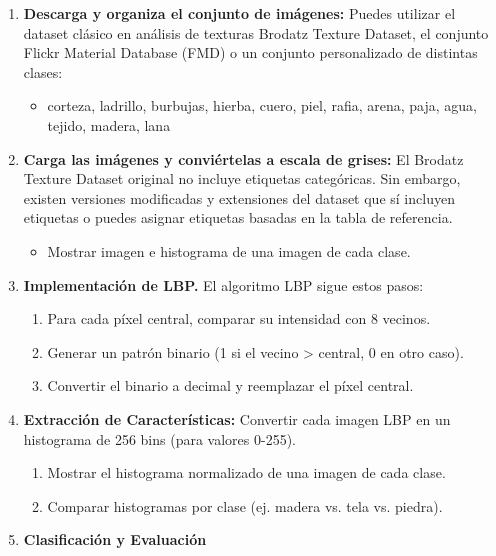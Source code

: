 
\begin{enumerate}
    \item \textbf{Descarga y organiza el conjunto de imágenes:} Puedes utilizar el dataset clásico
          en análisis de texturas Brodatz Texture Dataset, el conjunto Flickr Material Database (FMD) o
          un conjunto personalizado de distintas clases:
          \begin{itemize}
              \item corteza, ladrillo, burbujas, hierba, cuero, piel, rafia, arena, paja, agua, tejido,
                    madera, lana
          \end{itemize}
    \item \textbf{Carga las imágenes y conviértelas a escala de grises:} El Brodatz Texture
          Dataset original no incluye etiquetas categóricas. Sin embargo, existen versiones modificadas
          y extensiones del dataset que sí incluyen etiquetas o puedes asignar etiquetas basadas en la
          tabla de referencia.
          \begin{itemize}
              \item Mostrar imagen e histograma de una imagen de cada clase.
          \end{itemize}
    \item \textbf{Implementación de LBP.} El algoritmo LBP sigue estos pasos:
          \begin{enumerate}
              \item Para cada píxel central, comparar su intensidad con 8 vecinos.
              \item Generar un patrón binario (1 si el vecino > central, 0 en otro caso).
              \item Convertir el binario a decimal y reemplazar el píxel central.
          \end{enumerate}
    \item \textbf{Extracción de Características:} Convertir cada imagen LBP en un histograma de
          256 bins (para valores 0-255).
          \begin{enumerate}
              \item Mostrar el histograma normalizado de una imagen de cada clase.
              \item Comparar histogramas por clase (ej. madera vs. tela vs. piedra).
          \end{enumerate}
    \item \textbf{Clasificación y Evaluación}
          \begin{enumerate}

\end{enumerate}
\end{enumerate}
